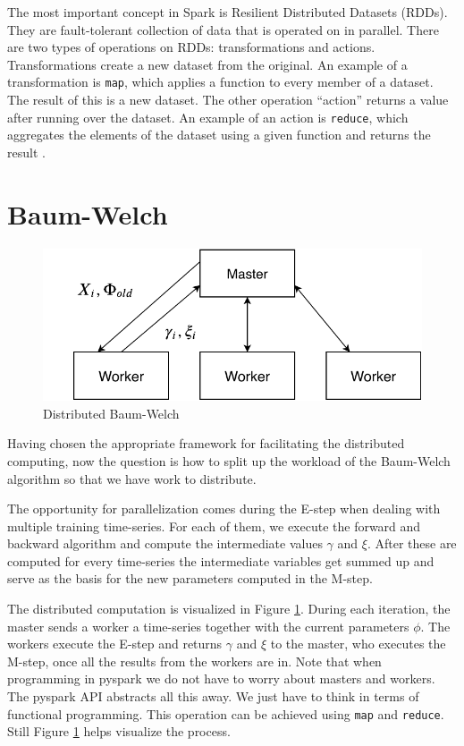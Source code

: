 The most important concept in Spark is Resilient Distributed Datasets (RDDs). They are fault-tolerant collection of data that is operated on in parallel. There are two types of operations on RDDs: transformations and actions. Transformations create a new dataset from the original. An example of a transformation is \texttt{map}, which applies a function to every member of a dataset. The result of this is a new dataset. The other operation ``action'' returns a value after running over the dataset. An example of an action is \texttt{reduce}, which aggregates the elements of the dataset using a given function and returns the result \parencite{rddguide}.

\section{Baum-Welch}
\label{section:distributed-hmm}

\begin{figure}
  \centering
  \includegraphics{figures/distributed.pdf}
  \caption{Distributed Baum-Welch}
  \label{fig:distributed}
\end{figure}

Having chosen the appropriate framework for facilitating the distributed computing, now the question is how to split up the workload of the Baum-Welch algorithm so that we have work to distribute. 

The opportunity for parallelization comes during the E-step when dealing with multiple training time-series. For each of them, we execute the forward and backward algorithm and compute the intermediate values $\gamma$ and $\xi$. After these are computed for every time-series the intermediate variables get summed up and serve as the basis for the new parameters computed in the M-step.

The distributed computation is visualized in Figure \ref{fig:distributed}. During each iteration, the master sends a worker a time-series together with the current parameters $\phi$. The workers execute the E-step and returns $\gamma$ and $\xi$ to the master, who executes the M-step, once all the results from the workers are in. Note that when programming in pyspark we do not have to worry about masters and workers. The pyspark API abstracts all this away. We just have to think in terms of functional programming. This operation can be achieved using \texttt{map} and \texttt{reduce}. Still Figure \ref{fig:distributed} helps visualize the process. 

